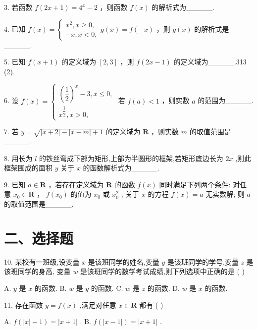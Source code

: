 3. 若函数 $f\left( {{2x} + 1}\right)  = {4}^{x} - 2$ ，则函数 $f\left( x\right)$ 的解析式为\_\_\_\_\_.

4. 已知 $f\left( x\right)  = \left\{  {\begin{array}{l} {x}^{2},x \geq  0, \\   - x,x < 0, \end{array}g\left( x\right)  = f\left( {-x}\right) }\right.$ ，则 $g\left( x\right)$ 的解析式是\_\_\_\_\_.

5. 已知 $f\left( {x + 1}\right)$ 的定义域为 $\left\lbrack  {2,3}\right\rbrack$ ，则 $f\left( {{2x} - 1}\right)$ 的定义域为\_\_\_\_\_.313 (2).

6. 设 $f\left( x\right)  = \left\{  \begin{array}{l} {\left( \dfrac{1}{2}\right) }^{x} - 3,x \leq  0, \\  {x}^{\dfrac{1}{2}},x > 0, \end{array}\right.$ 若 $f\left( a\right)  < 1$ ，则实数 $a$ 的范围为\_\_\_\_\_.

7. 若 $y = \sqrt{\left| {x + 2}\right|  - \left| {x - m}\right|  + 1}$ 的定义域为 $\mathbf{R}$ ，则实数 $m$ 的取值范围是\_\_\_\_\_.

8. 用长为 $l$ 的铁丝弯成下部为矩形,上部为半圆形的框架,若矩形底边长为 ${2x}$ ,则此框架围成的面积 $y$ 关于 $x$ 的函数解析式为\_\_\_\_\_.

9. 已知 $a \in  \mathbf{R}$ ，若存在定义域为 $\mathbf{R}$ 的函数 $f\left( x\right)$ 同时满足下列两个条件:  对任意 ${x}_{0} \in  \mathbf{R}$ ， $f\left( {x}_{0}\right)$ 的值为 ${x}_{0}$ 或 ${x}_{0}^{2}$ ;   关于 $x$ 的方程 $f\left( x\right)  = a$ 无实数解; 则 $a$ 的取值范围是\_\_\_\_\_.

\section*{二、选择题}

10. 某校有一班级,设变量 $x$ 是该班同学的姓名,变量 $y$ 是该班同学的学号,变量 $z$ 是该班同学的身高, 变量 $w$ 是该班同学的数学考试成绩,则下列选项中正确的是 ( )

A. $y$ 是 $x$ 的函数. B. $w$ 是 $y$ 的函数. C. $w$ 是 $z$ 的函数. D. $w$ 是 $x$ 的函数.

11. 存在函数 $y = f\left( x\right)$ ,满足对任意 $x \in  \mathbf{R}$ 都有 ( )

A. $f\left( {\left| x\right|  - 1}\right)  = \left| {x + 1}\right|$ . B. $f\left( \left| {x - 1}\right| \right)  = \left| {x + 1}\right|$ .

